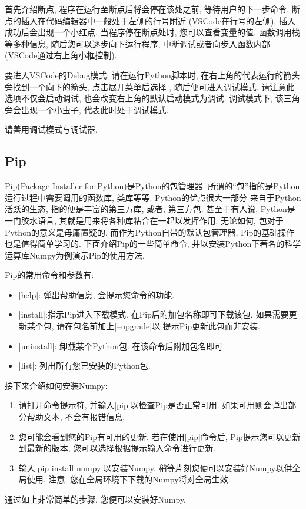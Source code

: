 \documentclass[11pt]{article}
\begin{document}
首先介绍断点, 程序在运行至断点后将会停在该处之前, 等待用户的下一步命令. 断点的插入在代码编辑器中一般处于左侧的行号附近 (VSCode在行号的左侧),
插入成功后会出现一个小红点. 当程序停在断点处时, 您可以查看变量的值, 函数调用栈等多种信息, 随后您可以逐步向下运行程序,
中断调试或者向步入函数内部(VSCode通过右上角小框控制).

要进入VSCode的Debug模式, 请在运行Python脚本时, 在右上角的代表运行的箭头旁找到一个向下的箭头, 点击展开菜单后选择
{}, 随后便可进入调试模式. 请注意此选项不仅会启动调试, 
也会改变右上角的默认启动模式为调试. 调试模式下, 该三角旁会出现一个小虫子, 代表此时处于调试模式.

请善用调试模式与调试器.
\subsection{Pip}
Pip(Package Installer for Python)是Python的包管理器. 所谓的``包''指的是Python运行过程中需要调用的函数库, 类库等等. Python的优点很大一部分
来自于Python活跃的生态, 指的便是丰富的第三方库, 或者, 第三方包. 甚至于有人说, Python是一门胶水语言, 其就是用来将各种库粘合在一起以发挥作用.
无论如何, 包对于Python的意义是毋庸置疑的, 而作为Python自带的默认包管理器, Pip的基础操作也是值得简单学习的. 下面介绍Pip的一些简单命令,
并以安装Python下著名的科学运算库Numpy为例演示Pip的使用方法.

Pip的常用命令和参数有:
\begin{itemize}
    \item \cverb|help|: 弹出帮助信息, 会提示您命令的功能.
    \item \cverb|install|:指示Pip进入下载模式. 在Pip后附加包名称即可下载该包. 如果需要更新某个包, 请在包名前加上\cverb|--upgrade|以
    提示Pip更新此包而非安装.
    \item \cverb|uninstall|: 卸载某个Python包. 在该命令后附加包名即可.
    \item \cverb|list|: 列出所有您已安装的Python包. 
\end{itemize}

接下来介绍如何安装Numpy:
\begin{enumerate}
    \item 请打开命令提示符, 并输入\cverb|pip|以检查Pip是否正常可用. 如果可用则会弹出部分帮助文本, 不会有报错信息,
    \item 您可能会看到您的Pip有可用的更新. 若在使用\cverb|pip|命令后, Pip提示您可以更新到最新的版本, 您可以选择根据提示输入命令进行更新.
    \item 输入\cverb|pip install numpy|以安装Numpy. 稍等片刻您便可以安装好Numpy以供全局使用. 注意, 您在全局环境下下载的Numpy将对全局生效.
\end{enumerate}
通过如上非常简单的步骤, 您便可以安装好Numpy.
\end{document}
